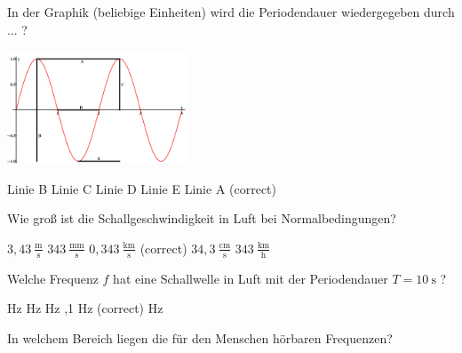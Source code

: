\documentclass[11pt]{exam}
\begin{document}
\setlength{\voffset}{-0.5in}
\setlength{\headsep}{5pt}

\hspace{2mm}
 \hspace{5mm}
\vspace{4mm}

\begin{questions}

\question In der Graphik (beliebige Einheiten) wird die Periodendauer wiedergegeben durch ... ? 

\includegraphics[width=0.4\textwidth]{images/Sinuskurve.png}

\begin{choices}
	\choice Linie B
	\choice Linie C
	\choice Linie D
	\choice Linie E
	\choice Linie A (correct)
\end{choices}

\vspace{3mm}\question Wie groß ist die Schallgeschwindigkeit in Luft bei Normalbedingungen?

\begin{choices}
	\choice \( \mathrm{3,43~\frac{m}{s}} \)
	\choice \( \mathrm{343~\frac{mm}{s}} \)
	\choice \( \mathrm{0,343~\frac{km}{s}} \) (correct)
	\choice \( \mathrm{34,3~\frac{cm}{s}} \)
	\choice \( \mathrm{343~\frac{km}{h}} \)
\end{choices}

\vspace{3mm}\question Welche Frequenz \( f \) hat eine Schallwelle in Luft mit der Periodendauer \( T= \mathrm{10~s} \) ?

\begin{choices}
	 Hz
	 Hz
	 Hz
	,1 Hz (correct)
	 Hz
\end{choices}

\vspace{3mm}\question In welchem Bereich liegen die für den Menschen hörbaren Frequenzen?


\end{questions}
\end{document}
